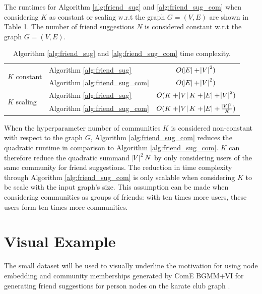 \documentclass[conference]{IEEEtran}
\begin{document}
The runtimes for Algorithm \ref{alg:friend_sug} and \ref{alg:friend_sug_com} when considering $K$ as constant or scaling w.r.t the graph $G = (V, E)$ are shown in Table \ref{tab:runtimes}. The number of friend suggestions $N$ is considered constant w.r.t the graph $G = (V, E)$.

\begin{table}
    \centering
    \caption{Algorithm \ref{alg:friend_sug} and \ref{alg:friend_sug_com} time complexity.}
    \label{tab:runtimes}
    \begin{tabular}{l l | c}
        \multirow{2}{*}{$K$ constant} & Algorithm \ref{alg:friend_sug}     & $O(\abs{E} + \abs{V}^2)$                          \\
                                      & Algorithm \ref{alg:friend_sug_com} & $O(\abs{E} + \abs{V}^2)$                          \\
        \hline
        \multirow{2}{*}{$K$ scaling}  & Algorithm \ref{alg:friend_sug}     & $O(K + \abs{V}K + \abs{E} + \abs{V}^2)$           \\
                                      & Algorithm \ref{alg:friend_sug_com} & $O(K + \abs{V}K + \abs{E} + \frac{\abs{V}^2}{K})$ \\
    \end{tabular}
\end{table}

When the hyperparameter number of communities $K$ is considered non-constant with respect to the graph $G$, Algorithm \ref{alg:friend_sug_com} reduces the quadratic runtime in comparison to Algorithm \ref{alg:friend_sug_com}.
$K$ can therefore reduce the quadratic summand $\abs{V}^2N$ by only considering users of the same community for friend suggestions. The reduction in time complexity through Algorithm \ref{alg:friend_sug_com} is only scalable when considering $K$ to be scale with the input graph's size. This assumption can be made when considering communities as groups of friends: with ten times more users, these users form ten times more communities.


\section{Visual Example}

The small  dataset will be used to visually underline the motivation for using node embedding and community memberships generated by ComE BGMM+VI for generating friend suggestions for person nodes on the karate club graph \cite{KarateClubDS}.
\end{document}
